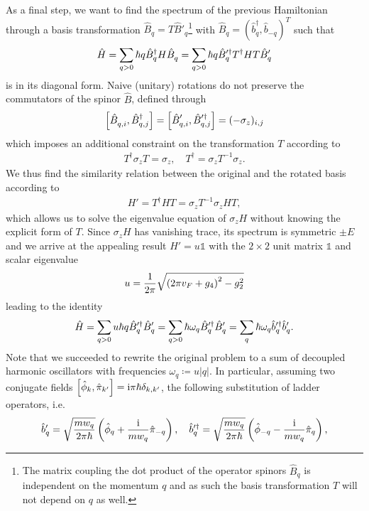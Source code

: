 As a final step, we want to find the spectrum of the previous Hamiltonian through a basis transformation $\hat B_q = T \hat B'_q$\footnote{The matrix coupling the dot product of the operator spinors $\hat B_q$ is independent on the momentum $q$ and as such the basis transformation $T$ will not depend on $q$ as well.} with $\hat B_q = (\hat b_q^\dag, \hat b_{-q})^T$ such that
\begin{align}
    \hat H = \sum_{q>0}\hbar q\hat B^\dag_q H \hat B^\pdag_q = \sum_{q>0}\hbar q\hat B'^\dag_q T^\dag H T \hat B'^\pdag_q
\end{align}
is in its diagonal form.
Naive (unitary) rotations do not preserve the commutators of the spinor $\hat B$, defined through
\begin{align}
    \commutator{\hat B_{q,i}^\pdag,\hat B^\dag_{q,j}} = \commutator{\hat B_{q,i}'^\pdag,\hat B'^\dag_{q,j}} = (-\sigma_z)_{i,j}
\end{align}
which imposes an additional constraint on the transformation $T$ according to
\begin{align}
    T^\dag\sigma_z T = \sigma_z,
    \quad
    T^\dag = \sigma_zT^{-1}\sigma_z.
\end{align}
We thus find the similarity relation between the original and the rotated basis according to
\begin{align}
    H'=T^\dag HT =\sigma_z T^{-1}\sigma_z H T,
\end{align}
which allows us to solve the eigenvalue equation of $\sigma_z H$ without knowing the explicit form of $T$.
Since $\sigma_zH$ has vanishing trace, its spectrum is symmetric $\pm E$ and we arrive at the appealing result $H' = u\mathbb1$ with the $2\times2$ unit matrix $\mathbb1$ and scalar eigenvalue
\begin{align}
    u = \frac1{2\pi}\sqrt{\left( 2\pi v_F + g_4 \right)^2 - g_2^2}
\end{align}
leading to the identity
\begin{align}
    \hat H = \sum_{q>0} u\hbar q \hat B'^\dag_q \hat B'^\pdag_q = \sum_{q>0} \hbar \omega_q \hat B'^\dag_q \hat B'^\pdag_q = \sum_q \hbar  \omega_q \hat b'^\dag_q\hat b'^\pdag_q.
\end{align}
Note that we succeeded to rewrite the original problem to a sum of decoupled harmonic oscillators with frequencies $\omega_q\coloneqq u|q|$.
In particular, assuming two conjugate fields $\left[ \hat \phi_{k},\hat \pi_{k'} \right] = \mathrm i\pi\hbar\delta_{k,k'}$, the following substitution of ladder operators, i.e.
\begin{align}
    \hat b'_q = \sqrt{\frac{mw_q}{2\pi\hbar}}\left( \hat\phi_q + \frac{\mathrm i}{mw_q}\hat\pi_{-q} \right),
    \quad
    \hat b'^\dag_q = \sqrt{\frac{mw_q}{2\pi\hbar}}\left( \hat\phi_{-q} - \frac{\mathrm i}{mw_q}\hat\pi_{q} \right),
\end{align}
